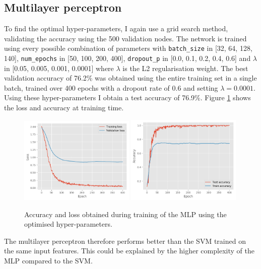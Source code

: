 \documentclass[12pt]{article}
\theoremstyle{definition}
\begin{document}
\subsection{Multilayer perceptron}
To find the optimal hyper-parameters, I again use a grid search method, validating the accuracy using the 500 validation nodes. The network is trained using every possible combination of parameters with \texttt{batch\_size} in [32, 64, 128, 140], \texttt{num\_epochs} in  [50, 100, 200, 400], \texttt{dropout\_p} in  [0.0, 0.1, 0.2, 0.4, 0.6] and $\lambda$ in  [0.05, 0.005, 0.001, 0.0001] where $\lambda$ is the L2 regularisation weight. The best validation accuracy of 76.2\% was obtained using the entire training set in a single batch, trained over 400 epochs with a dropout rate of 0.6 and setting $\lambda = 0.0001$. Using these hyper-parameters I obtain a test accuracy of 76.9\%. Figure \ref{fig/mlp_training} shows the loss and accuracy at training time.
\begin{figure}[H]
	\includegraphics[width=0.49\textwidth]{mlp/loss}
	\includegraphics[width=0.49\textwidth]{mlp/acc}
	\centering
	\caption{Accuracy and loss obtained during training of the MLP using the optimised hyper-parameters.}
	\label{fig/mlp_training}
\end{figure}

\bigskip

The multilayer perceptron therefore performs better than the SVM trained on the same input features. This could be explained by the higher complexity of the MLP compared to the SVM.
\end{document}
